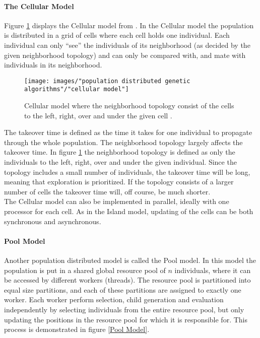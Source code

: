\paragraph*{The Cellular Model}
Figure \ref{Cellular model} displays the Cellular model from \cite{Gong}. In the Cellular model the population is distributed in a grid of cells where each cell holds one individual. Each individual can only ``see'' the individuals of its neighborhood (as decided by the given neighborhood topology) and can only be compared with, and mate with individuals in its neighborhood. \\


\begin{figure}[h!]
\begin{center}
\texttt{[image: images/"population distributed genetic algorithms"/"cellular model"]}
\caption{Cellular model where the neighborhood topology consist of the cells to the left, right, over and under the given cell \citep{Gong}.}
\label{Cellular model}
\end{center}
\end{figure}


\noindent The takeover time is defined as the time it takes for one individual to propagate through the whole population. The neighborhood topology largely affects the takeover time. In figure \ref{Cellular model} the neighborhood topology is defined as only the individuals to the left, right, over and under the given individual. Since the topology includes a small number of individuals, the takeover time will be long, meaning that exploration is prioritized. If the topology consists of a larger number of cells the takeover time will, off course, be much shorter.\\


\noindent The Cellular model can also be implemented in parallel, ideally with one processor for each cell. As in the Island model, updating of the cells can be both synchronous and asynchronous.


\paragraph*{Pool Model}
Another population distributed model is called the Pool model. In this model the population is put in a shared global resource pool of $n$ individuals, where it can be accessed by different workers (threads). The resource pool is partitioned into equal size partitions, and each of these partitions are assigned to exactly one worker. Each worker perform selection, child generation and evaluation independently by selecting individuals from the entire resource pool, but only updating the positions in the resource pool for which it is responsible for. This process is demonstrated in figure \ref{Pool Model}. \\


